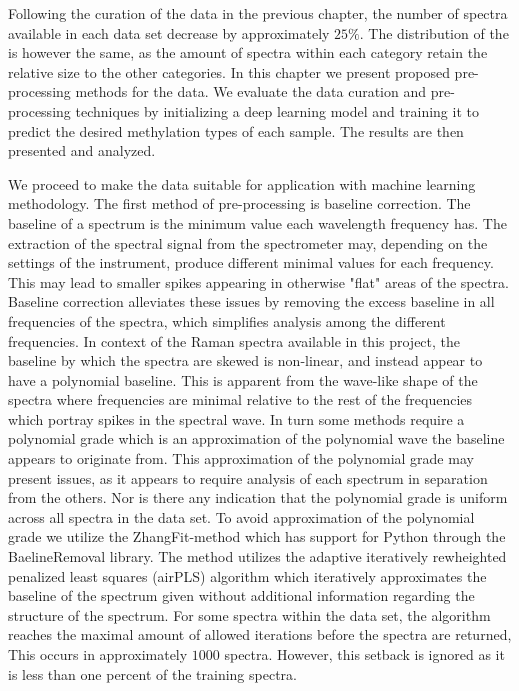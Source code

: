 Following the curation of the data in the previous chapter, the number of spectra available in each data set decrease by approximately $25\%$. The distribution of the is however the same, as the amount of spectra within each category retain the relative size to the other categories. In this chapter we present proposed pre-processing methods for the data. We evaluate the data curation and pre-processing techniques by initializing a deep learning model and training it to predict the desired methylation types of each sample. The results are then presented and analyzed.

We proceed to make the data suitable for application with machine learning methodology. The first method of pre-processing is baseline correction. The baseline of a spectrum is the minimum value each wavelength frequency has. The extraction of the spectral signal from the spectrometer may, depending on the settings of the instrument, produce different minimal values for each frequency. This may lead to smaller spikes appearing in otherwise "flat" areas of the spectra. Baseline correction alleviates these issues by removing the excess baseline in all frequencies of the spectra, which simplifies analysis among the different frequencies. In context of the Raman spectra available in this project, the baseline by which the spectra are skewed is non-linear, and instead appear to have a polynomial baseline. This is apparent from the wave-like shape of the spectra where frequencies are minimal relative to the rest of the frequencies which portray spikes in the spectral wave. In turn some methods require a polynomial grade which is an approximation of the polynomial wave the baseline appears to originate from. This approximation of the polynomial grade may present issues, as it appears to require analysis of each spectrum in separation from the others. Nor is there any indication that the polynomial grade is uniform across all spectra in the data set. To avoid approximation of the polynomial grade we utilize the ZhangFit-method which has support for Python through the BaelineRemoval library. The method utilizes the adaptive iteratively rewheighted penalized least squares (airPLS) algorithm which iteratively approximates the baseline of the spectrum given without additional information regarding the structure of the spectrum. For some spectra within the data set, the algorithm reaches the maximal amount of allowed iterations before the spectra are returned, This occurs in approximately $1000$ spectra. However, this setback is ignored as it is less than one percent of the training spectra. 


